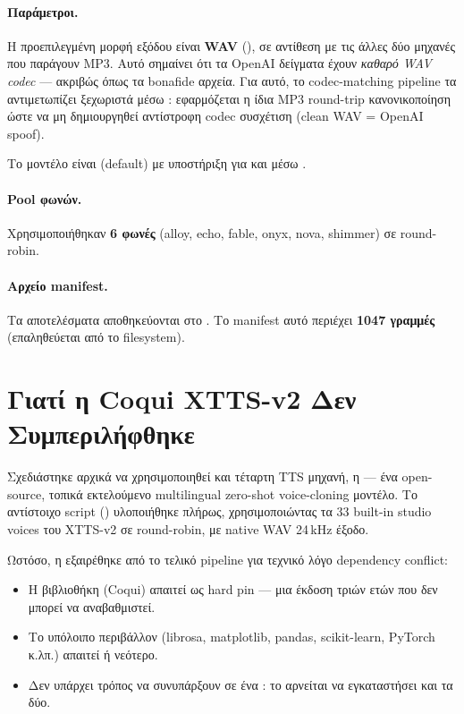 \paragraph{Παράμετροι.}
Η προεπιλεγμένη μορφή εξόδου είναι \textbf{WAV}
(), σε αντίθεση με τις άλλες δύο
μηχανές που παράγουν MP3.
Αυτό σημαίνει ότι τα OpenAI δείγματα έχουν \emph{καθαρό WAV codec}
— ακριβώς όπως τα bonafide αρχεία.
Για αυτό, το codec-matching pipeline τα αντιμετωπίζει ξεχωριστά
μέσω :
εφαρμόζεται η ίδια MP3 round-trip κανονικοποίηση ώστε να μη
δημιουργηθεί αντίστροφη codec συσχέτιση (clean WAV = OpenAI spoof).

Το μοντέλο είναι  (default) με υποστήριξη για
 και  μέσω .

\paragraph{Pool φωνών.}
Χρησιμοποιήθηκαν \textbf{6 φωνές} (alloy, echo, fable, onyx, nova,
shimmer) σε round-robin.

\paragraph{Αρχείο manifest.}
Τα αποτελέσματα αποθηκεύονται στο
.
Το manifest αυτό περιέχει \textbf{1047 γραμμές} (επαληθεύεται από
το filesystem).

\section{Γιατί η Coqui XTTS-v2 Δεν Συμπεριλήφθηκε}
\label{sec:coqui-dropped}

Σχεδιάστηκε αρχικά να χρησιμοποιηθεί και τέταρτη TTS μηχανή,
η  — ένα open-source, τοπικά εκτελούμενο
multilingual zero-shot voice-cloning μοντέλο.
Το αντίστοιχο script ()
υλοποιήθηκε πλήρως, χρησιμοποιώντας τα 33 built-in studio voices του
XTTS-v2 σε round-robin, με native WAV 24\,kHz έξοδο.

Ωστόσο, η  εξαιρέθηκε από το τελικό pipeline
για τεχνικό λόγο dependency conflict:

\begin{itemize}
  \item Η βιβλιοθήκη  (Coqui) απαιτεί
    \textbf{} ως hard pin — μια έκδοση
    τριών ετών που δεν μπορεί να αναβαθμιστεί.
  \item Το υπόλοιπο περιβάλλον (librosa, matplotlib, pandas,
    scikit-learn, PyTorch κ.λπ.) απαιτεί 
    ή νεότερο.
  \item Δεν υπάρχει τρόπος να συνυπάρξουν σε ένα :
    το  αρνείται να εγκαταστήσει και τα δύο.
\end{itemize}

